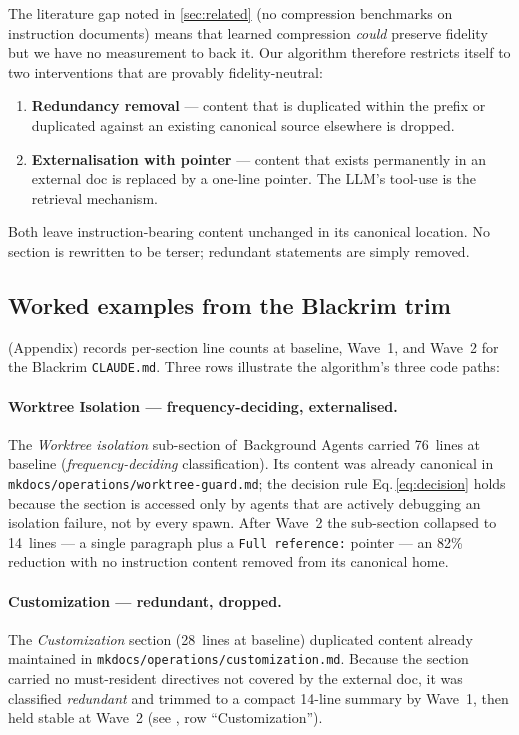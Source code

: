 The literature gap noted in \cref{sec:related} (no compression
benchmarks on instruction documents) means that learned compression
\emph{could} preserve fidelity but we have no measurement to back
it. Our algorithm therefore restricts itself to two interventions
that are provably fidelity-neutral:

\begin{enumerate}
  \item \textbf{Redundancy removal} — content that is duplicated
    within the prefix or duplicated against an existing canonical
    source elsewhere is dropped.
  \item \textbf{Externalisation with pointer} — content that exists
    permanently in an external doc is replaced by a one-line pointer.
    The LLM's tool-use is the retrieval mechanism.
\end{enumerate}

Both leave instruction-bearing content unchanged in its canonical
location. No section is rewritten to be terser; redundant statements
are simply removed.

\subsection{Worked examples from the Blackrim trim}
\label{sec:worked-examples}

 (Appendix) records per-section line counts at
baseline, Wave~1, and Wave~2 for the Blackrim \texttt{CLAUDE.md}.
Three rows illustrate the algorithm's three code paths:

\paragraph{Worktree Isolation — frequency-deciding, externalised.}
The \textit{Worktree isolation} sub-section of \textsection\,Background
Agents carried 76~lines at baseline (\emph{frequency-deciding}
classification).  Its content was already canonical in
\texttt{mkdocs/operations/worktree-guard.md}; the decision rule
Eq.\,\eqref{eq:decision} holds because the section is accessed only by
agents that are actively debugging an isolation failure, not by every
spawn.  After Wave~2 the sub-section collapsed to 14~lines — a single
paragraph plus a \texttt{Full reference:} pointer — an 82\% reduction
with no instruction content removed from its canonical home.

\paragraph{Customization — redundant, dropped.}
The \textit{Customization} section (28~lines at baseline) duplicated
content already maintained in \texttt{mkdocs/operations/customization.md}.
Because the section carried no must-resident directives not covered by
the external doc, it was classified \emph{redundant} and trimmed to a
compact 14-line summary by Wave~1, then held stable at Wave~2
(see , row ``Customization'').

